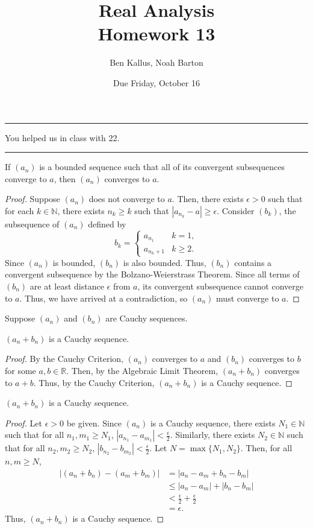 \documentclass[12pt]{article}
\title{Real Analysis \\ Homework 13}
\author{Ben Kallus, Noah Barton}
\date{Due Friday, October 16}
\begin{document}
\maketitle

\hrule
\bigskip

 You helped us in class with 22.

\bigskip
\hrule
\bigskip

 If $(a_n)$ is a bounded sequence such that all of its convergent subsequences converge to $a$, then $(a_n)$ converges to $a$.
\begin{proof}
    Suppose $(a_n)$ does not converge to $a$. Then, there exists $\epsilon > 0$ such that for each $k \in \mathbb N$, there exists $n_k \geq k$ such that $|a_{n_k} - a| \geq \epsilon$. Consider $(b_k)$, the subsequence of $(a_n)$ defined by $$b_k = \begin{cases} a_{n_1} & k = 1, \\ a_{n_k+1} & k \geq 2. \end{cases}$$ Since $(a_n)$ is bounded, $(b_n)$ is also bounded. Thus, $(b_n)$ contains a convergent subsequence by the Bolzano-Weierstrass Theorem. Since all terms of $(b_n)$ are at least distance $\epsilon$ from $a$, its convergent subsequence cannot converge to $a$. Thus, we have arrived at a contradiction, so $(a_n)$ must converge to $a$.
\end{proof}

\newpage
{} Suppose $(a_n)$ and $(b_n)$ are Cauchy sequences.

\medskip
{} $(a_n + b_n)$ is a Cauchy sequence.
\begin{proof}
    By the Cauchy Criterion, $(a_n)$ converges to $a$ and $(b_n)$ converges to $b$ for some $a,b \in \mathbb R$. Then, by the Algebraic Limit Theorem, $(a_n + b_n)$ converges to $a+b$. Thus, by the Cauchy Criterion, $(a_n + b_n)$ is a Cauchy sequence.
\end{proof}

\medskip
{} $(a_n + b_n)$ is a Cauchy sequence.
\begin{proof}
    Let $\epsilon > 0$ be given. Since $(a_n)$ is a Cauchy sequence, there exists $N_1 \in \mathbb N$ such that for all $n_1,m_1 \geq N_1$, $|a_{n_1} - a_{m_1}| < \frac\epsilon2$. Similarly, there exists $N_2 \in \mathbb N$ such that for all $n_2,m_2 \geq N_2$, $|b_{n_2} - b_{m_2}| < \frac\epsilon2$. Let $N = \max\{N_1, N_2\}$. Then, for all $n,m \geq N$,
    \begin{align*}
        |(a_{n} + b_{n}) - (a_{m} + b_{m})| &= |a_{n} - a_{m} + b_{n} - b_{m}| \\
                                            &\leq |a_{n} - a_{m}| + |b_{n} - b_{m}| \\
                                            &< \frac\epsilon2 + \frac\epsilon2 \\
                                            &= \epsilon.
    \end{align*}
    Thus, $(a_n + b_n)$ is a Cauchy sequence.
\end{proof}
\end{document}
